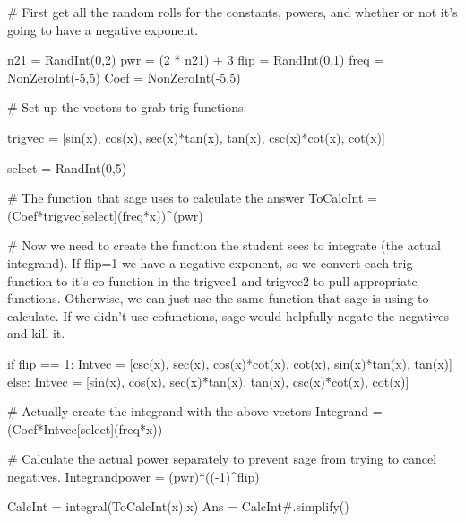 
\begin{sagesilent}
# First get all the random rolls for the constants, powers, and whether or not it's going to have a negative exponent.

n21 = RandInt(0,2)
pwr = (2 * n21) + 3
flip = RandInt(0,1)
freq = NonZeroInt(-5,5)
Coef = NonZeroInt(-5,5)

# Set up the vectors to grab trig functions.

trigvec = [sin(x), cos(x), sec(x)*tan(x), tan(x), csc(x)*cot(x), cot(x)]

select = RandInt(0,5)

# The function that sage uses to calculate the answer
ToCalcInt = (Coef*trigvec[select](freq*x))^(pwr)

# Now we need to create the function the student sees to integrate (the actual integrand). If flip=1 we have a negative exponent, so we convert each trig function to it's co-function in the trigvec1 and trigvec2 to pull appropriate functions. Otherwise, we can just use the same function that sage is using to calculate. If we didn't use cofunctions, sage would helpfully negate the negatives and kill it.

if flip == 1:
    Intvec = [csc(x), sec(x), cos(x)*cot(x), cot(x), sin(x)*tan(x), tan(x)]
else:
    Intvec = [sin(x), cos(x), sec(x)*tan(x), tan(x), csc(x)*cot(x), cot(x)]

# Actually create the integrand with the above vectors
Integrand = (Coef*Intvec[select](freq*x))

# Calculate the actual power separately to prevent sage from trying to cancel negatives.
Integrandpower = (pwr)*((-1)^flip)

CalcInt = integral(ToCalcInt(x),x)
Ans = CalcInt#.simplify()
\end{sagesilent}

